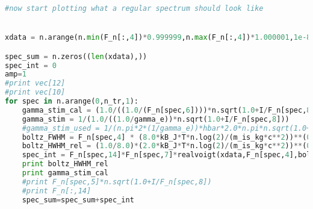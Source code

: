 {\begin{lstlisting}[language=Python,breaklines]
#now start plotting what a regular spectrum should look like


xdata = n.arange(n.min(F_n[:,4])*0.999999,n.max(F_n[:,4])*1.000001,1e-8)

spec_sum = n.zeros((len(xdata),))
spec_int = 0
amp=1
#print vec[12]
#print vec[10]
for spec in n.arange(0,n_tr,1):
	gamma_stim_cal = (1.0/((1.0/(F_n[spec,6])))*n.sqrt(1.0+I/F_n[spec,8]))
	gamma_stim = 1/(1.0/((1.0/gamma_e))*n.sqrt(1.0+I/F_n[spec,8]))
	#gamma_stim_used = 1/(n.pi*2*(1/gamma_e))*hbar*2.0*n.pi*n.sqrt(1.0+I_s/F_n[spec,8])
	boltz_FWHM = F_n[spec,4] * (8.0*kB_J*T*n.log(2)/(m_is_kg*c**2))**(0.5)
	boltz_HWHM_rel = (1.0/8.0)*(2.0*kB_J*T*n.log(2)/(m_is_kg*c**2))**(0.5)
	spec_int = F_n[spec,14]*F_n[spec,7]*realvoigt(xdata,F_n[spec,4],boltz_HWHM_rel,gamma_stim_cal)#plot the peak weighed by the chances of it not being pumped
	print boltz_HWHM_rel
	print gamma_stim_cal
	#print F_n[spec,5]*n.sqrt(1.0+I/F_n[spec,8])
	#print F_n[:,14]
	spec_sum=spec_sum+spec_int


\end{lstlisting}
}